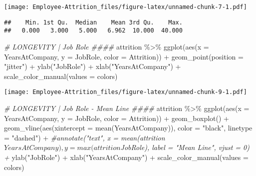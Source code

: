 \documentclass[
]{article}
\newenvironment{Shaded}{\begin{snugshade}}{\end{snugshade}}
\newcommand{\AttributeTok}[1]{\textcolor[rgb]{0.77,0.63,0.00}{#1}}
\newcommand{\CommentTok}[1]{\textcolor[rgb]{0.56,0.35,0.01}{\textit{#1}}}
\newcommand{\FunctionTok}[1]{\textcolor[rgb]{0.00,0.00,0.00}{#1}}
\newcommand{\NormalTok}[1]{#1}
\newcommand{\SpecialCharTok}[1]{\textcolor[rgb]{0.00,0.00,0.00}{#1}}
\newcommand{\StringTok}[1]{\textcolor[rgb]{0.31,0.60,0.02}{#1}}
\begin{document}
\texttt{[image: Employee-Attrition\_files/figure-latex/unnamed-chunk-7-1.pdf]}

\begin{Shaded}
\end{Shaded}

\begin{verbatim}
##    Min. 1st Qu.  Median    Mean 3rd Qu.    Max. 
##   0.000   3.000   5.000   6.962  10.000  40.000
\end{verbatim}

\begin{Shaded}
\begin{Highlighting}[]
\CommentTok{\# LONGEVITY | Job Role \#\#\#\#}
\NormalTok{attrition }\SpecialCharTok{\%\textgreater{}\%} \FunctionTok{ggplot}\NormalTok{(}\FunctionTok{aes}\NormalTok{(}\AttributeTok{x =}\NormalTok{ YearsAtCompany, }\AttributeTok{y =}\NormalTok{ JobRole, }\AttributeTok{color =}\NormalTok{ Attrition)) }\SpecialCharTok{+}
  \FunctionTok{geom\_point}\NormalTok{(}\AttributeTok{position =} \StringTok{"jitter"}\NormalTok{) }\SpecialCharTok{+}
  \FunctionTok{ylab}\NormalTok{(}\StringTok{"JobRole"}\NormalTok{) }\SpecialCharTok{+}
  \FunctionTok{xlab}\NormalTok{(}\StringTok{"YearsAtCompany"}\NormalTok{) }\SpecialCharTok{+}
  \FunctionTok{scale\_color\_manual}\NormalTok{(}\AttributeTok{values =}\NormalTok{ colors)}
\end{Highlighting}
\end{Shaded}

\texttt{[image: Employee-Attrition\_files/figure-latex/unnamed-chunk-9-1.pdf]}

\begin{Shaded}
\begin{Highlighting}[]
\CommentTok{\# LONGEVITY | Job Role {-} Mean Line \#\#\#\# }
\NormalTok{attrition }\SpecialCharTok{\%\textgreater{}\%} \FunctionTok{ggplot}\NormalTok{(}\FunctionTok{aes}\NormalTok{(}\AttributeTok{x =}\NormalTok{ YearsAtCompany, }\AttributeTok{y =}\NormalTok{ JobRole, }\AttributeTok{color =}\NormalTok{ Attrition)) }\SpecialCharTok{+}
  \FunctionTok{geom\_boxplot}\NormalTok{() }\SpecialCharTok{+}
  \FunctionTok{geom\_vline}\NormalTok{(}\FunctionTok{aes}\NormalTok{(}\AttributeTok{xintercept =} \FunctionTok{mean}\NormalTok{(YearsAtCompany)), }\AttributeTok{color =} \StringTok{"black"}\NormalTok{, }\AttributeTok{linetype =} \StringTok{"dashed"}\NormalTok{) }\SpecialCharTok{+}
  \CommentTok{\#annotate("text", x = mean(attrition$YearsAtCompany), y = max(attrition$JobRole), label = "Mean Line", vjust = 0) +}
  \FunctionTok{ylab}\NormalTok{(}\StringTok{"JobRole"}\NormalTok{) }\SpecialCharTok{+}
  \FunctionTok{xlab}\NormalTok{(}\StringTok{"YearsAtCompany"}\NormalTok{) }\SpecialCharTok{+}
  \FunctionTok{scale\_color\_manual}\NormalTok{(}\AttributeTok{values =}\NormalTok{ colors)}
\end{Highlighting}
\end{Shaded}
\end{document}
